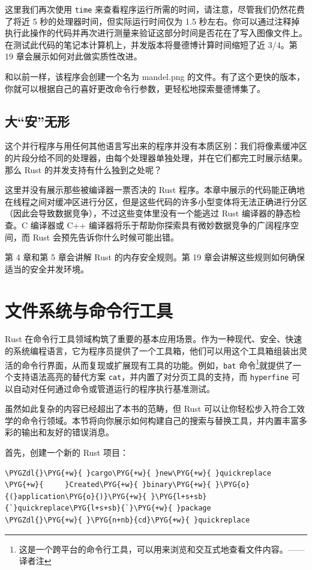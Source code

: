 这里我们再次使用 \texttt{time} 来查看程序运行所需的时间，请注意，尽管我们仍然花费了将近 5 秒的处理器时间，但实际运行时间仅为 1.5 秒左右。你可以通过注释掉执行此操作的代码并再次进行测量来验证这部分时间是否花在了写入图像文件上。在测试此代码的笔记本计算机上，并发版本将曼德博计算时间缩短了近 3/4。第 19 章会展示如何对此做实质性改进。

和以前一样，该程序会创建一个名为 mandel.png 的文件。有了这个更快的版本，你就可以根据自己的喜好更改命令行参数，更轻松地探索曼德博集了。

\subsection{大“安”无形}

这个并行程序与用任何其他语言写出来的程序并没有本质区别：我们将像素缓冲区的片段分给不同的处理器，由每个处理器单独处理，并在它们都完工时展示结果。那么 Rust 的并发支持有什么独到之处呢？

这里并没有展示那些被编译器一票否决的 Rust 程序。本章中展示的代码能正确地在线程之间对缓冲区进行分区，但是这些代码的许多小型变体将无法正确进行分区（因此会导致数据竞争），不过这些变体里没有一个能逃过 Rust 编译器的静态检查。C 编译器或 C++ 编译器将乐于帮助你探索具有微妙数据竞争的广阔程序空间，而 Rust 会预先告诉你什么时候可能出错。

第 4 章和第 5 章会讲解 Rust 的内存安全规则。第 19 章会讲解这些规则如何确保适当的安全并发环境。

\section{文件系统与命令行工具}

Rust 在命令行工具领域构筑了重要的基本应用场景。作为一种现代、安全、快速的系统编程语言，它为程序员提供了一个工具箱，他们可以用这个工具箱组装出灵活的命令行界面，从而复现或扩展现有工具的功能。例如，\texttt{bat} 命令\footnote{这是一个跨平台的命令行工具，可以用来浏览和交互式地查看文件内容。——译者注}就提供了一个支持语法高亮的替代方案 \texttt{cat}，并内置了对分页工具的支持，而 \texttt{hyperfine} 可以自动对任何通过命令或管道运行的程序执行基准测试。

虽然如此复杂的内容已经超出了本书的范畴，但 Rust 可以让你轻松步入符合工效学的命令行领域。本节将向你展示如何构建自己的搜索与替换工具，并内置丰富多彩的输出和友好的错误消息。

首先，创建一个新的 Rust 项目：

\begin{Verbatim}[commandchars=\\\{\},breaklines=true,breakanywhere=true,fontsize=\codefont,xleftmargin=17bp]
\PYGZdl{}\PYG{+w}{ }cargo\PYG{+w}{ }new\PYG{+w}{ }quickreplace
\PYG{+w}{     }Created\PYG{+w}{ }binary\PYG{+w}{ }\PYG{o}{(}application\PYG{o}{)}\PYG{+w}{ }\PYG{l+s+sb}{`}quickreplace\PYG{l+s+sb}{`}\PYG{+w}{ }package
\PYGZdl{}\PYG{+w}{ }\PYG{n+nb}{cd}\PYG{+w}{ }quickreplace
\end{Verbatim}

